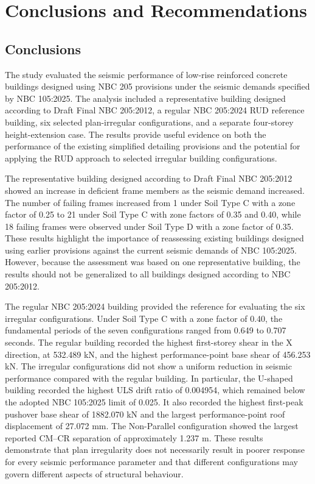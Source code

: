 \chapter[CONCLUSIONS AND RECOMMENDATIONS]{Conclusions and Recommendations}

\section{Conclusions}
The study evaluated the seismic performance of low-rise reinforced concrete buildings designed using NBC 205 provisions under the seismic demands specified by NBC 105:2025. The analysis included a representative building designed according to Draft Final NBC 205:2012, a regular NBC 205:2024 RUD reference building, six selected plan-irregular configurations, and a separate four-storey height-extension case. The results provide useful evidence on both the performance of the existing simplified detailing provisions and the potential for applying the RUD approach to selected irregular building configurations.

The representative building designed according to Draft Final NBC 205:2012 showed an increase in deficient frame members as the seismic demand increased. The number of failing frames increased from 1 under Soil Type C with a zone factor of 0.25 to 21 under Soil Type C with zone factors of 0.35 and 0.40, while 18 failing frames were observed under Soil Type D with a zone factor of 0.35. These results highlight the importance of reassessing existing buildings designed using earlier provisions against the current seismic demands of NBC 105:2025. However, because the assessment was based on one representative building, the results should not be generalized to all buildings designed according to NBC 205:2012.

The regular NBC 205:2024 building provided the reference for evaluating the six irregular configurations. Under Soil Type C with a zone factor of 0.40, the fundamental periods of the seven configurations ranged from 0.649 to 0.707 seconds. The regular building recorded the highest first-storey shear in the X direction, at 532.489 kN, and the highest performance-point base shear of 456.253 kN. The irregular configurations did not show a uniform reduction in seismic performance compared with the regular building. In particular, the U-shaped building recorded the highest ULS drift ratio of 0.004954, which remained below the adopted NBC 105:2025 limit of 0.025. It also recorded the highest first-peak pushover base shear of 1882.070 kN and the largest performance-point roof displacement of 27.072 mm. The Non-Parallel configuration showed the largest reported CM--CR separation of approximately 1.237 m. These results demonstrate that plan irregularity does not necessarily result in poorer response for every seismic performance parameter and that different configurations may govern different aspects of structural behaviour.


